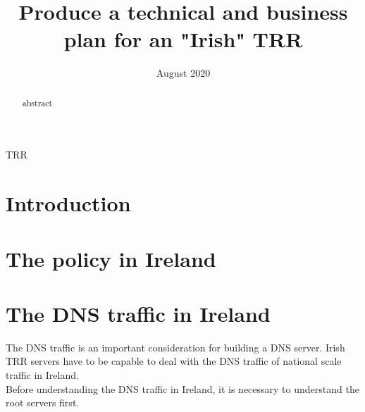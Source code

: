 \documentclass[conference]{IEEEtran}
\begin{document}
\title{Produce a technical and business plan for an "Irish" TRR}

\author{
\and
{}
}

\date{August 2020}



\maketitle

\begin{abstract}
abstract
\end{abstract}

\begin{IEEEkeywords}
TRR
\end{IEEEkeywords}

\section{Introduction}

\section{The policy in Ireland}

\section{The DNS traffic in Ireland}

The DNS traffic is an important consideration for building a DNS server. Irish TRR servers have to be capable to deal with the DNS traffic of national scale traffic in Ireland.
\\

Before understanding the DNS traffic in Ireland, it is necessary to understand the root servers first.
\\
\end{document}
